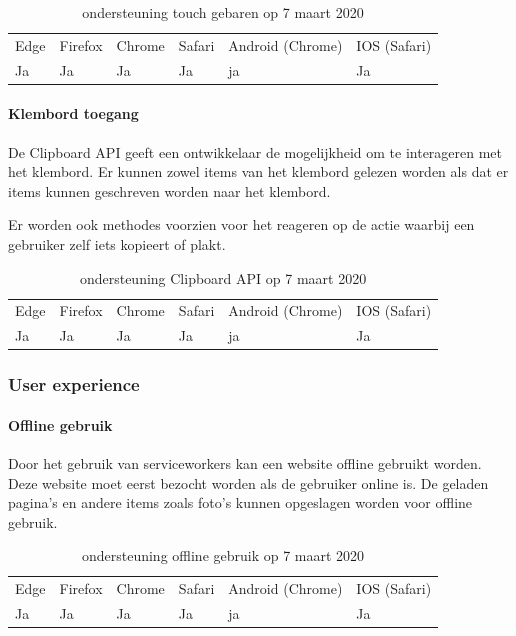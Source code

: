 \begin{table}[H]
	\centering
	\begin{tabular}{llllll}
		Edge & Firefox & Chrome & Safari & Android (Chrome) & IOS (Safari) \\
		Ja   & Ja      &  Ja     & Ja     & ja               & Ja          
	\end{tabular}	
	\caption{ondersteuning touch gebaren op 7 maart 2020}
\end{table}	

\paragraph{Klembord toegang}
De Clipboard API \autocite{Kacmarcik2019} geeft een ontwikkelaar de mogelijkheid om te interageren met het klembord. Er kunnen zowel items van het klembord gelezen worden als dat er items kunnen geschreven worden naar het klembord.

Er worden ook methodes voorzien voor het reageren op de actie waarbij een gebruiker zelf iets kopieert of plakt. 

\begin{table}[H]
	\centering
	\begin{tabular}{llllll}
		Edge & Firefox & Chrome & Safari & Android (Chrome) & IOS (Safari) \\
		Ja   & Ja      &  Ja     & Ja     & ja               & Ja          
	\end{tabular}	
	\caption{ondersteuning Clipboard API op 7 maart 2020}
\end{table}	


\subsubsection{User experience}

\paragraph{Offline gebruik}
Door het gebruik van serviceworkers kan een website offline gebruikt worden. Deze website moet eerst bezocht worden als de gebruiker online is. De geladen pagina’s en andere items zoals foto’s kunnen opgeslagen worden voor offline gebruik.

\begin{table}[H]
	\begin{tabular}{llllll}
		Edge & Firefox & Chrome & Safari & Android (Chrome) & IOS (Safari) \\
		Ja   & Ja      &  Ja     & Ja     & ja               & Ja          
	\end{tabular}	
	\caption{ondersteuning offline gebruik op 7 maart 2020}
\end{table}	



